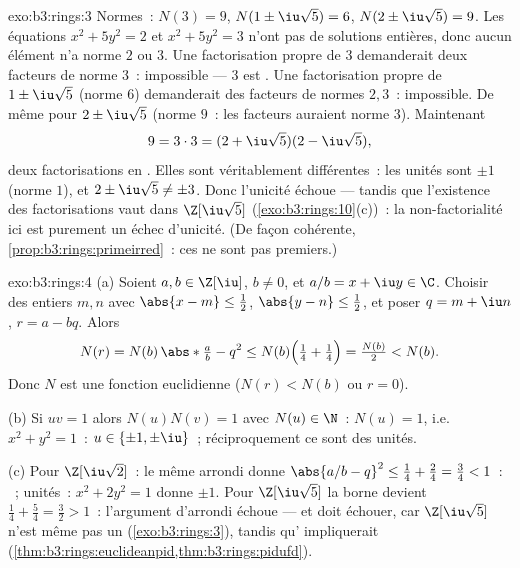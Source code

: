 \begin{solution}{exo:b3:rings:3}
Normes~: $N(3) = 9$, $N(1 \pm \iu\sqrt5) = 6$, $N(2 \pm
\iu\sqrt5) = 9$. Les équations $x^2 + 5y^2 = 2$ et $x^2 + 5y^2 =
3$ n'ont pas de solutions entières, donc aucun élément n'a norme
$2$ ou $3$. Une factorisation propre de $3$ demanderait deux
facteurs de norme $3$~: impossible --- $3$ est . Une
factorisation propre de $1 \pm \iu\sqrt5$ (norme $6$) demanderait
des facteurs de normes $2, 3$~: impossible. De même pour $2 \pm
\iu\sqrt5$ (norme $9$~: les facteurs auraient norme $3$).
Maintenant
\[
9 = 3 \cdot 3 = (2 + \iu\sqrt5)(2 - \iu\sqrt5),
\]
deux factorisations en . Elles sont véritablement
différentes~: les unités sont $\pm 1$ (norme $1$), et $2 \pm
\iu\sqrt5 \neq \pm 3$. Donc l'unicité échoue --- tandis que
l'existence des factorisations vaut dans $\Z[\iu\sqrt5]$
(\cref{exo:b3:rings:10}(c))~: la non-factorialité ici est purement
un échec d'unicité. (De façon cohérente,
\cref{prop:b3:rings:primeirred}~: ces  ne sont pas
premiers.)
\end{solution}

\begin{solution}{exo:b3:rings:4}
(a) Soient $a, b \in \Z[\iu]$, $b \neq 0$, et $a/b = x + \iu y
\in \C$. Choisir des entiers $m, n$ avec $\abs{x - m} \leq
\frac12$, $\abs{y - n} \leq \frac12$, et poser $q = m + \iu n$,
$r = a - bq$. Alors
\[
N(r) = N(b)\,\abs*{\tfrac ab - q}^2
\leq N(b)\Bigl(\tfrac14 + \tfrac14\Bigr) = \tfrac{N(b)}2 < N(b).
\]
Donc $N$ est une fonction euclidienne ($N(r) < N(b)$ ou $r =
0$).

(b) Si $uv = 1$ alors $N(u)N(v) = 1$ avec $N(u) \in \N$~: $N(u)
= 1$, i.e.\ $x^2 + y^2 = 1$~: $u \in \{\pm 1, \pm\iu\}$~;
réciproquement ce sont des unités.

(c) Pour $\Z[\iu\sqrt2]$~: le même arrondi donne $\abs{a/b -
q}^2 \leq \frac14 + \frac{2}4 = \frac34 < 1$~: ~;
unités~: $x^2 + 2y^2 = 1$ donne $\pm 1$. Pour
$\Z[\iu\sqrt5]$ la borne devient $\frac14 + \frac54 = \frac32 >
1$~: l'argument d'arrondi échoue --- et doit échouer, car
$\Z[\iu\sqrt5]$ n'est même pas un 
(\cref{exo:b3:rings:3}), tandis qu' impliquerait 
(\cref{thm:b3:rings:euclideanpid,thm:b3:rings:pidufd}).
\end{solution}

